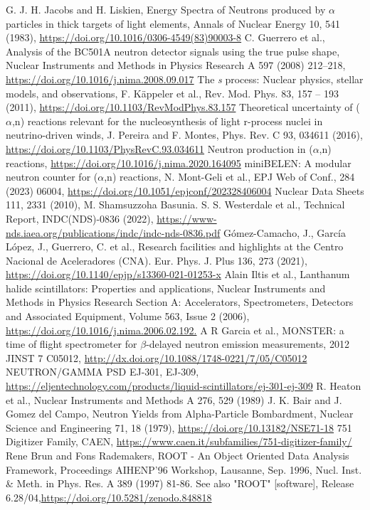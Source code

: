 \documentclass[a4paper,12pt]{report}
\newcommand{\an}{($\alpha$,n) }
\begin{document}
\begin{thebibliography}{5}
	G. J. H. Jacobs and H. Liskien, Energy Spectra of Neutrons produced by $\alpha$ particles in thick targets of light elements, Annals of Nuclear Energy 10, 541 (1983), \url{https://doi.org/10.1016/0306-4549(83)90003-8}
	C. Guerrero et al., Analysis of the BC501A neutron detector signals using the true pulse shape, Nuclear Instruments and Methods in Physics Research A 597 (2008) 212–218, \url{https://doi.org/10.1016/j.nima.2008.09.017}
	The \textit{s} process: Nuclear physics, stellar models, and observations, F. Käppeler et al., Rev. Mod. Phys. 83, 157 – 193 (2011), \url{https://doi.org/10.1103/RevModPhys.83.157}
	Theoretical uncertainty of \an reactions relevant for the nucleosynthesis of light r-process nuclei in neutrino-driven winds, J. Pereira and F. Montes, Phys. Rev. C 93, 034611 (2016), \url{https://doi.org/10.1103/PhysRevC.93.034611}
	Neutron production in \an reactions, \url{https://doi.org/10.1016/j.nima.2020.164095}
	miniBELEN: A modular neutron counter for \an reactions, N. Mont-Geli et al., EPJ Web of Conf., 284 (2023) 06004, \url{https://doi.org/10.1051/epjconf/202328406004}
	Nuclear Data Sheets 111, 2331 (2010), M. Shamsuzzoha Basunia.
	S. S. Westerdale et al., Technical Report, INDC(NDS)-0836 (2022), \url{https://www-nds.iaea.org/publications/indc/indc-nds-0836.pdf}
	Gómez-Camacho, J., García López, J., Guerrero, C. et al., Research facilities and highlights at the Centro Nacional de Aceleradores (CNA). Eur. Phys. J. Plus 136, 273 (2021), \url{https://doi.org/10.1140/epjp/s13360-021-01253-x}
	Alain Iltis et al., Lanthanum halide scintillators: Properties and applications, Nuclear Instruments and Methods in Physics Research Section A: Accelerators, Spectrometers, Detectors and Associated Equipment, Volume 563, Issue 2 (2006), \url{https://doi.org/10.1016/j.nima.2006.02.192.}
	A R Garcia et al., MONSTER: a time of flight spectrometer for $\beta$-delayed neutron emission measurements, 2012 JINST 7 C05012, \url{http://dx.doi.org/10.1088/1748-0221/7/05/C05012}
	NEUTRON/GAMMA PSD EJ-301, EJ-309, \url{https://eljentechnology.com/products/liquid-scintillators/ej-301-ej-309}
	R. Heaton et al., Nuclear Instruments and Methods A 276, 529 (1989)
	J. K. Bair and J. Gomez del Campo, Neutron Yields from Alpha-Particle Bombardment, Nuclear Science and Engineering 71, 18 (1979), \url{https://doi.org/10.13182/NSE71-18}
	751 Digitizer Family, CAEN, \url{https://www.caen.it/subfamilies/751-digitizer-family/}
	Rene Brun and Fons Rademakers, ROOT - An Object Oriented Data Analysis Framework, Proceedings AIHENP'96 Workshop, Lausanne, Sep. 1996, Nucl. Inst. \& Meth. in Phys. Res. A 389 (1997) 81-86. See also "ROOT" [software], Release 6.28/04,\url{https://doi.org/10.5281/zenodo.848818}
\end{thebibliography}
\end{document}
